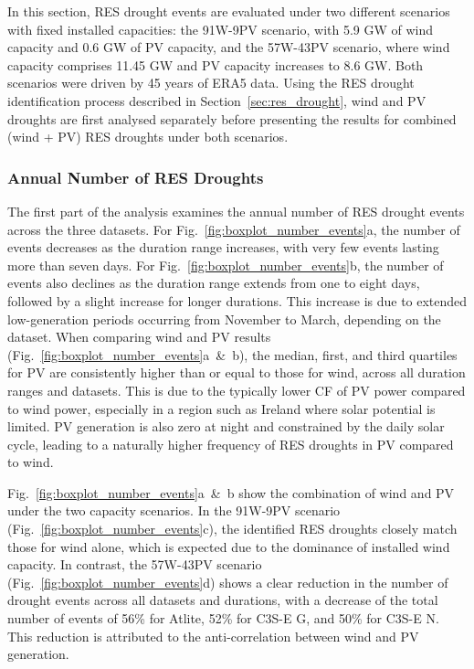 \documentclass[preprint, 12pt, authoryear]{elsarticle}
\begin{document}
In this section, RES drought events are evaluated under two different scenarios with fixed installed capacities: the 91W-9PV scenario, with 5.9 GW of wind capacity and 0.6 GW of PV capacity, and the 57W-43PV scenario, where wind capacity comprises 11.45 GW and PV capacity increases to 8.6 GW. Both scenarios were driven by 45 years of ERA5 data. Using the RES drought identification process described in Section~\ref{sec:res_drought}, wind and PV droughts are first analysed separately before presenting the results for combined (wind + PV) RES droughts under both scenarios.

\subsubsection{Annual Number of RES Droughts}

The first part of the analysis examines the annual number of RES drought events across the three datasets. For Fig.~\ref{fig:boxplot_number_events}a, the number of events decreases as the duration range increases, with very few events lasting more than seven days. For Fig.~\ref{fig:boxplot_number_events}b, the number of events also declines as the duration range extends from one to eight days, followed by a slight increase for longer durations. This increase is due to extended low-generation periods occurring from November to March, depending on the dataset. When comparing wind and PV results (Fig.~\ref{fig:boxplot_number_events}a~\&~b), the median, first, and third quartiles for PV are consistently higher than or equal to those for wind, across all duration ranges and datasets. This is due to the typically lower CF of PV power compared to wind power, especially in a region such as Ireland where solar potential is limited. PV generation is also zero at night and constrained by the daily solar cycle, leading to a naturally higher frequency of RES droughts in PV compared to wind.

Fig.~\ref{fig:boxplot_number_events}a~\&~b show the combination of wind and PV under the two capacity scenarios. In the 91W-9PV scenario (Fig.~\ref{fig:boxplot_number_events}c), the identified RES droughts closely match those for wind alone, which is expected due to the dominance of installed wind capacity. In contrast, the 57W-43PV scenario (Fig.~\ref{fig:boxplot_number_events}d) shows a clear reduction in the number of drought events across all datasets and durations, with a decrease of the total number of events of 56\% for Atlite, 52\% for C3S-E G, and 50\% for C3S-E N. This reduction is attributed to the anti-correlation between wind and PV generation.
\end{document}
